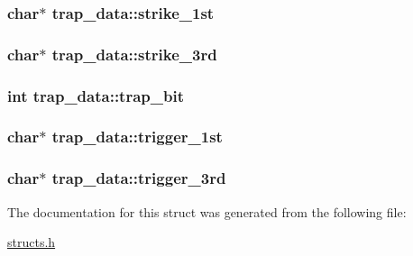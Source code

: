 \hypertarget{structtrap__data_a28d2de746f6ee62bdf3c28672a066141}{
\subsubsection[{strike\-\_\-1st}]{\setlength{\rightskip}{0pt plus 5cm}char$\ast$ trap\-\_\-data\-::strike\-\_\-1st}}\label{structtrap__data_a28d2de746f6ee62bdf3c28672a066141}
\hypertarget{structtrap__data_a32b2eada9b8ea8c2eede402df18c01bd}{
\subsubsection[{strike\-\_\-3rd}]{\setlength{\rightskip}{0pt plus 5cm}char$\ast$ trap\-\_\-data\-::strike\-\_\-3rd}}\label{structtrap__data_a32b2eada9b8ea8c2eede402df18c01bd}
\hypertarget{structtrap__data_a8862ab3a9cdd7a46361828ad2a66f4ea}{
\subsubsection[{trap\-\_\-bit}]{\setlength{\rightskip}{0pt plus 5cm}int trap\-\_\-data\-::trap\-\_\-bit}}\label{structtrap__data_a8862ab3a9cdd7a46361828ad2a66f4ea}
\hypertarget{structtrap__data_a2f261980b7e0470577cb9be011869de9}{
\subsubsection[{trigger\-\_\-1st}]{\setlength{\rightskip}{0pt plus 5cm}char$\ast$ trap\-\_\-data\-::trigger\-\_\-1st}}\label{structtrap__data_a2f261980b7e0470577cb9be011869de9}
\hypertarget{structtrap__data_a61054d9c06ffcfbc66c4d1e21e29d090}{
\subsubsection[{trigger\-\_\-3rd}]{\setlength{\rightskip}{0pt plus 5cm}char$\ast$ trap\-\_\-data\-::trigger\-\_\-3rd}}\label{structtrap__data_a61054d9c06ffcfbc66c4d1e21e29d090}


The documentation for this struct was generated from the following file\-:\begin{DoxyCompactItemize}
\item 
\hyperlink{structs_8h}{structs.\-h}\end{DoxyCompactItemize}

